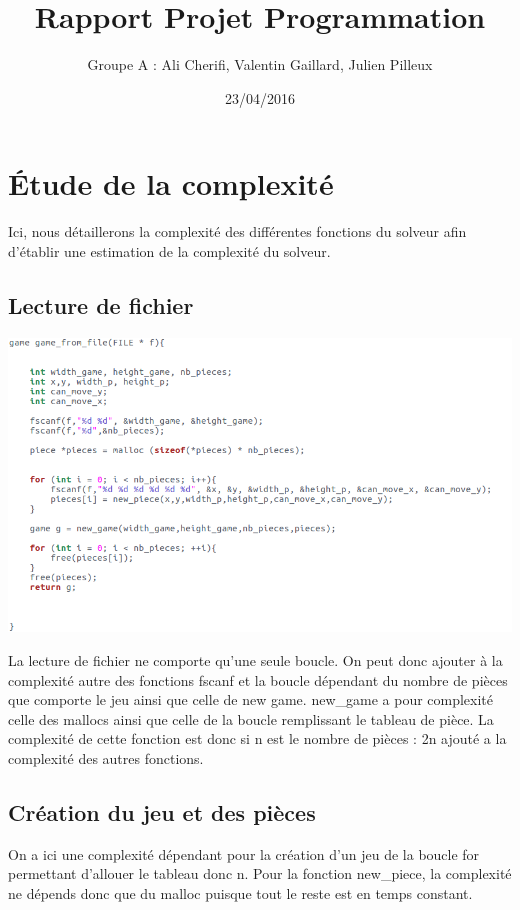 \documentclass{article}
\title{Rapport Projet Programmation}
\author{Groupe A : Ali Cherifi, Valentin Gaillard, Julien Pilleux}
\date{23/04/2016}
\begin{document}
\maketitle

\newpage

\section{Étude de la complexité}

Ici, nous détaillerons la complexité des différentes fonctions du solveur afin d'établir une estimation de la complexité du solveur.

\subsection{Lecture de fichier}

\begin{flushleft}
\includegraphics[scale=0.45]{gamefromfile.png}
\end{flushleft}

La lecture de fichier ne comporte qu'une seule boucle. On peut donc ajouter à la complexité autre des fonctions fscanf et la boucle dépendant du nombre de pièces que comporte le jeu ainsi que celle de new game.
new\_game a pour complexité celle des mallocs ainsi que celle de la boucle remplissant le tableau de pièce. La complexité de cette fonction est donc si n est le nombre de pièces : 2n ajouté a la complexité des autres fonctions.

\subsection{Création du jeu et des pièces}

On a ici une complexité dépendant pour la création d'un jeu de la boucle for permettant d'allouer le tableau donc n.
Pour la fonction new\_piece, la complexité ne dépends donc que du malloc puisque tout le reste est en temps constant. 
\end{document}
